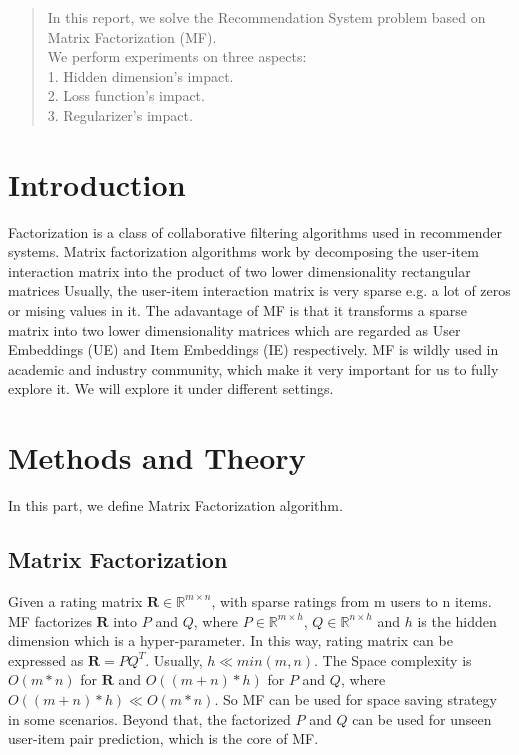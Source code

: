 \documentclass[journal, a4paper]{IEEEtran}
\begin{document}
\begin{abstract}
In this report, we solve the Recommendation System problem based on Matrix Factorization (MF). \\
We perform experiments on three aspects: \\
1. Hidden dimension's impact. \\
2. Loss function's impact. \\
3. Regularizer's impact. \\
\end{abstract}

\section{Introduction}
 Factorization is a class of collaborative filtering algorithms used in recommender systems. Matrix factorization algorithms work by decomposing the user-item interaction matrix into the product of two lower dimensionality rectangular matrices Usually, the user-item interaction matrix is very sparse e.g. a lot of zeros or mising values in it. The adavantage of MF is that it transforms a sparse matrix into two lower dimensionality matrices which are regarded as User Embeddings (UE) and Item Embeddings (IE) respectively. MF is wildly used in academic and industry community, which make it very important for us to fully explore it. We will explore it under different settings. 

\section{Methods and Theory}
In this part, we define Matrix Factorization algorithm.
\subsection{Matrix Factorization}
Given a rating matrix $\mathbf{R} \in \mathbb{R}^{m \times n} $, with sparse ratings from m users to n items. MF factorizes $\mathbf{R}$ into $P$ and $Q$, where $P \in \mathbb{R}^{m \times h }$, $Q \in \mathbb{R}^{n \times h}$ and $h$ is the hidden dimension which is a hyper-parameter. In this way, rating matrix can be expressed as $\mathbf{R} = P Q^{T}$.  Usually, $h \ll min(m, n)$. The Space complexity is $O(m*n)$ for $\mathbf{R}$ and $O((m+n)*h)$ for $P$ and $Q$, where $O((m+n)*h) \ll O(m*n)$. So MF can be used for space saving strategy in some scenarios. Beyond that, the factorized $P$ and $Q$ can be used for unseen user-item pair prediction, which is the core of MF.\par
\end{document}
